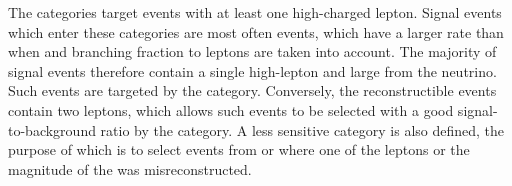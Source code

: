 The \VHLeptonicTag categories target events with at least one high-\pT charged lepton. Signal events which enter these categories are most often \WH events, which have a larger rate than \ZH when \crosssection and branching fraction to leptons are taken into account. The majority of signal events therefore contain a single high-\pT lepton and large \MET from the neutrino. Such events are targeted by the \WHLeptonicTag category. Conversely, the reconstructible \ZH events contain two leptons, which allows such events to be selected with a good signal-to-background ratio by the \ZHLeptonicTag category. A less sensitive \VHLeptonicLooseTag category is also defined, the purpose of which is to select events from \WH or \ZH where one of the leptons or the magnitude of the \MET was misreconstructed. 

